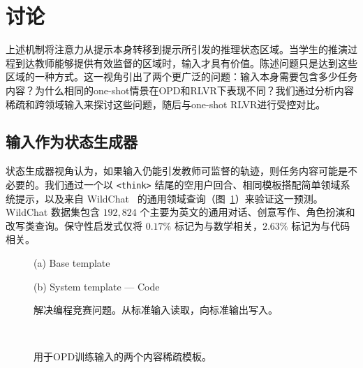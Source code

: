 
\section{讨论}
\label{sec:discussion}

上述机制将注意力从提示本身转移到提示所引发的推理状态区域。当学生的推演过程到达教师能够提供有效监督的区域时，输入才具有价值。陈述问题只是达到这些区域的一种方式。这一视角引出了两个更广泛的问题：输入本身需要包含多少任务内容？为什么相同的one-shot情景在OPD和RLVR下表现不同？我们通过分析内容稀疏和跨领域输入来探讨这些问题，随后与one-shot RLVR进行受控对比。

\subsection{输入作为状态生成器}
\label{sec:template}

状态生成器视角认为，如果输入仍能引发教师可监督的轨迹，则任务内容可能是不必要的。我们通过一个以 \texttt{<think>} 结尾的空用户回合、相同模板搭配简单领域系统提示，以及来自 WildChat~\citep{zhao2024wildchat} 的通用领域查询（图~\ref{fig:template-examples}）来验证这一预测。WildChat 数据集包含 \(192{,}824\) 个主要为英文的通用对话、创意写作、角色扮演和改写类查询。保守性启发式仅将 \(0.17\%\)  标记为与数学相关，\(2.63\%\)  标记为与代码相关。

\begin{figure}[t]
\centering
\begin{minipage}[t]{0.485\textwidth}
\begin{tplbox}{(a) Base template}
\begin{tplinput}
\ttfamily\scriptsize\raggedright {}
\end{tplinput}
\end{tplbox}
\end{minipage}\hfill
\begin{minipage}[t]{0.485\textwidth}
\begin{tplbox}{(b) System template --- Code}
\begin{tplinput}
\ttfamily\scriptsize\raggedright {}解决编程竞赛问题。从标准输入读取，向标准输出写入。
\end{tplinput}
\end{tplbox}
\end{minipage}
\\[4pt]
\caption{用于OPD训练输入的两个内容稀疏模板。}
\label{fig:template-examples}
\end{figure}

